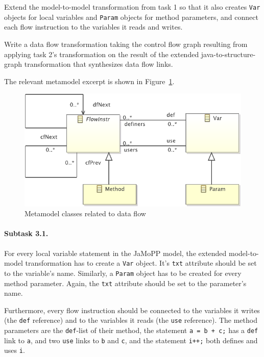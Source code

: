 \documentclass[11pt]{article}
\begin{document}
\begin{compactenum}
\item Extend the model-to-model transformation from task 1 so that it also
  creates \verb|Var| objects for local variables and \verb|Param| objects for
  method parameters, and connect each flow instruction to the variables it
  reads and writes.
\item Write a data flow transformation taking the control flow graph resulting
  from applying task 2's transformation on the result of the extended
  java-to-structure-graph transformation that synthesizes data flow links.
\end{compactenum}

The relevant metamodel excerpt is shown in Figure~\ref{fig:data-flow-mm}.

\begin{figure}[h!]
  \centering
  \includegraphics[width=0.6\linewidth]{../metamodel/DataFlowGraph}
  \caption{Metamodel classes related to data flow}
  \label{fig:data-flow-mm}
\end{figure}

\paragraph{Subtask 3.1.}
\label{sec:subtask-3.1}

For every local variable statement in the JaMoPP model, the extended
model-to-model transformation has to create a \verb|Var| object.  It's
\verb|txt| attribute should be set to the variable's name.  Similarly, a
\verb|Param| object has to be created for every method parameter.  Again, the
\verb|txt| attribute should be set to the parameter's name.

Furthermore, every flow instruction should be connected to the variables it
writes (the \verb|def| reference) and to the variables it reads (the \verb|use|
reference).  The method parameters are the \verb|def|-list of their method, the
statement \verb|a = b + c;| has a \verb|def| link to \verb|a|, and two
\verb|use| links to \verb|b| and \verb|c|, and the statement \verb|i++;| both
defines and uses \verb|i|.
\end{document}
